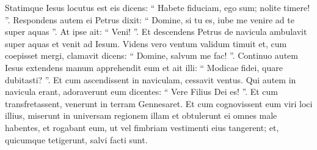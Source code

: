 \begin{biblechapter}
\begin{biblechapter}
\begin{biblechapter}
\begin{biblechapter}
\begin{biblechapter}
\begin{biblechapter}
\begin{biblechapter}
\begin{biblechapter}
\begin{biblechapter}
\begin{biblechapter}
\begin{biblechapter}
\begin{biblechapter}
\begin{biblechapter}
\begin{biblechapter}
\verse Statimque Iesus locutus est eis dicens: “ Habete fiduciam, ego sum; nolite timere! ”. 
 \verse Respondens autem ei Petrus dixit: “ Domine, si tu es, iube me venire ad te super aquas ”. 
\verse At ipse ait: “ Veni! ”. Et descendens Petrus de navicula ambulavit super aquas et venit ad Iesum. 
\verse Videns vero ventum validum timuit et, cum coepisset mergi, clamavit dicens: “ Domine, salvum me fac! ”. 
 \verse Continuo autem Iesus extendens manum apprehendit eum et ait illi: “ Modicae fidei, quare dubitasti? ”. 
\verse Et cum ascendissent in naviculam, cessavit ventus. 
\verse Qui autem in navicula erant, adoraverunt eum dicentes: “ Vere Filius Dei es! ”.
 \verse Et cum transfretassent, venerunt in terram Gennesaret. 
\verse Et cum cognovissent eum viri loci illius, miserunt in universam regionem illam et obtulerunt ei omnes male habentes, 
\verse et rogabant eum, ut vel fimbriam vestimenti eius tangerent; et, quicumque tetigerunt, salvi facti sunt.
 

\end{biblechapter}
\end{biblechapter}
\end{biblechapter}
\end{biblechapter}
\end{biblechapter}
\end{biblechapter}
\end{biblechapter}
\end{biblechapter}
\end{biblechapter}
\end{biblechapter}
\end{biblechapter}
\end{biblechapter}
\end{biblechapter}
\end{biblechapter}
